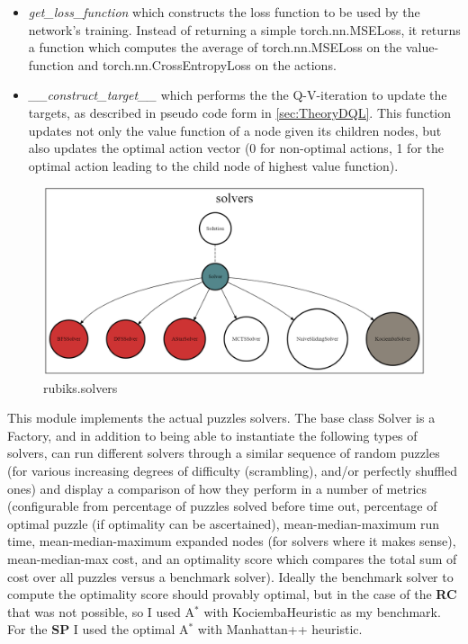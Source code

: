 \begin{itemize}
\begin{itemize}
\item \textit{get\_loss\_function} which constructs the loss function to be used by the network's training. Instead of returning a simple torch.nn.MSELoss, it returns a function which computes the average of torch.nn.MSELoss on the value-function and torch.nn.CrossEntropyLoss on the actions.
\item \textit{\_\_construct\_target\_\_} which performs the the Q-V-iteration to update the targets, as described in pseudo code form in \ref{sec:TheoryDQL}. This function updates not only the value function of a node given its children nodes, but also updates the optimal action vector (0 for non-optimal actions, 1 for the optimal action leading to the child node of highest value function).
\end{itemize} 


\end{itemize}


\label{sec:codesolvers}
\begin{figure}[H]
\centering
\includegraphics[scale=0.22]{./Figures/codebasesolvers}
\caption[Codebase]{rubiks.solvers}
\label{fig:Codebasesolvers}
\end{figure}
This module implements the actual puzzles solvers. The base class Solver is a Factory, and in addition to being able to instantiate the following types of solvers, can run different solvers through a similar sequence of random puzzles (for various increasing degrees of difficulty (scrambling), and/or perfectly shuffled ones) and display a comparison of how they perform in a number of metrics (configurable from percentage of puzzles solved before time out, percentage of optimal puzzle (if optimality can be ascertained), mean-median-maximum run time, mean-median-maximum expanded nodes (for solvers where it makes sense), mean-median-max cost, and an optimality score which compares the total sum of cost over all puzzles versus a benchmark solver). Ideally the benchmark solver to compute the optimality score should provably optimal, but in the case of the \textbf{RC} that was not possible, so I used A$^{*}$ with KociembaHeuristic as my benchmark. For the \textbf{SP} I used the optimal A$^{*}$ with Manhattan++ heuristic.

